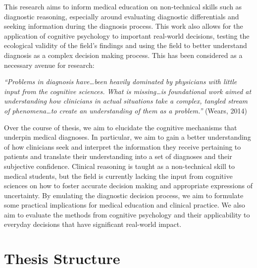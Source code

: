 \documentclass[a4paper, nobind]{templates/ociamthesis}
\begin{document}
\hfill\break
This research aims to inform medical education on non-technical skills such as diagnostic reasoning, especially around evaluating diagnostic differentials and seeking information during the diagnosis process. This work also allows for the application of cognitive psychology to important real-world decisions, testing the ecological validity of the field's findings and using the field to better understand diagnosis as a complex decision making process. This has been considered as a necessary avenue for research:

\hfill\break
\emph{``Problems in diagnosis have\ldots been heavily dominated by physicians with little input from the cognitive sciences. What is missing\ldots is foundational work aimed at understanding how clinicians in actual situations take a complex, tangled stream of phenomena\ldots to create an understanding of them as a problem.''} (Wears, 2014)

\hfill\break
Over the course of thesis, we aim to elucidate the cognitive mechanisms that underpin medical diagnoses. In particular, we aim to gain a better understanding of how clinicians seek and interpret the information they receive pertaining to patients and translate their understanding into a set of diagnoses and their subjective confidence. Clinical reasoning is taught as a non-technical skill to medical students, but the field is currently lacking the input from cognitive sciences on how to foster accurate decision making and appropriate expressions of uncertainty. By emulating the diagnostic decision process, we aim to formulate some practical implications for medical education and clinical practice. We also aim to evaluate the methods from cognitive psychology and their applicability to everyday decisions that have significant real-world impact.

\newpage

\section*{Thesis Structure}\label{thesis-structure}
\end{document}
